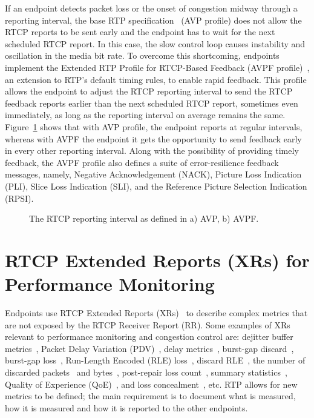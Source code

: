 
If an endpoint detects packet loss or the onset of congestion midway through a
reporting interval, the base RTP specification~\cite{rfc3550} (AVP profile)
does not allow the RTCP reports to be sent early and the endpoint has to wait for
the next scheduled RTCP report. In this case, the slow control loop causes
instability and oscillation in the media bit rate. To overcome this
shortcoming, endpoints implement the Extended RTP Profile for RTCP-Based
Feedback (AVPF profile)~\cite{rfc4585}, an extension to RTP's default timing
rules, to enable rapid feedback. This profile allows the endpoint to adjust the
RTCP reporting interval to send the RTCP feedback reports earlier than the
next scheduled RTCP report, sometimes even immediately, as long as the reporting
interval on average remains the same. Figure~\ref{fig:3:avpf.interval} shows
that with AVP profile, the endpoint reports at regular intervals, whereas with AVPF
the endpoint it gets the opportunity to send feedback early in every other reporting
interval. Along with the possibility of providing timely feedback, the AVPF
profile also defines a suite of error-resilience feedback messages, namely,
Negative Acknowledgement (NACK), Picture Loss Indication (PLI), Slice Loss
Indication (SLI), and the Reference Picture Selection Indication (RPSI).

\begin{figure}[!t]
\caption{The RTCP reporting interval as defined in a) AVP, b) AVPF.}
\label{fig:3:avpf.interval}
\end{figure}




\section{RTCP Extended Reports (XRs) for Performance Monitoring}

Endpoints use RTCP Extended Reports (XRs)~\cite{rfc3611, draft.rtcweb.xr} to describe complex
metrics that are not exposed by the RTCP Receiver Report (RR). Some examples
of XRs relevant to performance monitoring and congestion control are: dejitter
buffer metrics~\cite{rfc7005}, Packet Delay Variation (PDV)~\cite{rfc6798},
delay metrics~\cite{rfc6843}, burst-gap discard~\cite{rfc7003}, burst-gap
loss~\cite{rfc6958}, Run-Length Encoded (RLE) loss~\cite{rfc3611}, discard
RLE~\cite{rfc7097}, the number of discarded packets~\cite{rfc7002} and
bytes~\cite{rfc7243}, post-repair loss count~\cite{draft.xr.post.repair},
summary statistics~\cite{rfc7004}, Quality of Experience
(QoE)~\cite{rfc7266}, and loss concealment~\cite{rfc7294}, etc. RTP allows for
new metrics to be defined; the main requirement is to document what is
measured, how it is measured and how it is reported to the other endpoints.


